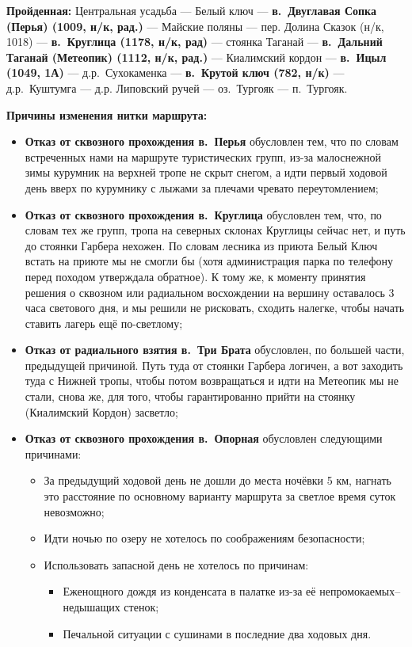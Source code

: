 \textbf{Пройденная:} Центральная усадьба --- Белый ключ --- \textbf{в.~Двуглавая Сопка (Перья) (1009, н/к, рад.)} --- Майские поляны --- пер. Долина Сказок (н/к, 1018) --- \textbf{в.~Круглица (1178, н/к, рад)} --- стоянка Таганай --- \textbf{в.~Дальний Таганай (Метеопик) (1112, н/к, рад.)} --- Киалимский кордон --- \textbf{в.~Ицыл (1049, 1А)} ---  д.р.~Сухокаменка --- \textbf{в.~Крутой ключ (782, н/к)} --- д.р.~Куштумга --- д.р. Липовский ручей --- оз.~Тургояк --- п.~Тургояк.


\textbf{Причины изменения нитки маршрута:}
\begin{itemize}
	\item \textbf{Отказ от сквозного прохождения в.~Перья} обусловлен тем, что по словам встреченных нами на маршруте туристических групп, из-за малоснежной зимы курумник на верхней тропе не скрыт снегом, а идти первый ходовой день вверх по курумнику с лыжами за плечами чревато переутомлением;
	\item \textbf{Отказ от сквозного прохождения в.~Круглица} обусловлен тем, что, по словам тех же групп, тропа на северных склонах Круглицы сейчас нет, и путь до стоянки Гарбера нехожен. По словам лесника из приюта Белый Ключ встать на приюте мы не смогли бы (хотя администрация парка по телефону перед походом утверждала обратное). К тому же, к моменту принятия решения о сквозном или радиальном восхождении на вершину оставалось 3 часа светового дня, и мы решили не рисковать, сходить налегке, чтобы начать ставить лагерь ещё по-светлому;
	\item \textbf{Отказ от радиального взятия в.~Три Брата} обусловлен, по большей части, предыдущей причиной. Путь туда от стоянки Гарбера логичен, а вот заходить туда с Нижней тропы, чтобы потом возвращаться и идти на Метеопик мы не стали, снова же, для того, чтобы гарантированно прийти на стоянку (Киалимский Кордон) засветло;
	\item \textbf{Отказ от сквозного прохождения в.~Опорная} обусловлен следующими причинами:	
	\begin{itemize}
		\item За предыдущий ходовой день не дошли до места ночёвки 5 км, нагнать это расстояние по основному варианту маршрута за светлое время суток невозможно;
		\item Идти ночью по озеру не хотелось по соображениям безопасности;
		\item Использовать запасной день не хотелось по причинам:
		\begin{itemize}
			\item Еженощного дождя из конденсата в палатке из-за её непромокаемых--недышащих стенок;
			\item Печальной ситуации с сушинами в последние два ходовых дня.
		\end{itemize}
		
	\end{itemize}
\end{itemize}

